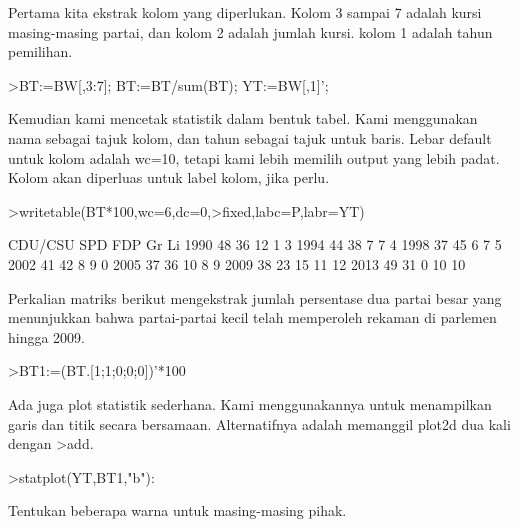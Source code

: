 \documentclass{article}
\begin{document}
\begin{eulernotebook}
\begin{eulercomment}
\begin{eulercomment}
\begin{eulercomment}
Pertama kita ekstrak kolom yang diperlukan. Kolom 3 sampai 7 adalah
kursi masing-masing partai, dan kolom 2 adalah jumlah kursi. kolom 1
adalah tahun pemilihan.
\end{eulercomment}
\begin{eulerprompt}
>BT:=BW[,3:7]; BT:=BT/sum(BT); YT:=BW[,1]';
\end{eulerprompt}
\begin{eulercomment}
Kemudian kami mencetak statistik dalam bentuk tabel. Kami menggunakan
nama sebagai tajuk kolom, dan tahun sebagai tajuk untuk baris. Lebar
default untuk kolom adalah wc=10, tetapi kami lebih memilih output
yang lebih padat. Kolom akan diperluas untuk label kolom, jika perlu.
\end{eulercomment}
\begin{eulerprompt}
>writetable(BT*100,wc=6,dc=0,>fixed,labc=P,labr=YT)
\end{eulerprompt}
\begin{euleroutput}
         CDU/CSU   SPD   FDP    Gr    Li
    1990      48    36    12     1     3
    1994      44    38     7     7     4
    1998      37    45     6     7     5
    2002      41    42     8     9     0
    2005      37    36    10     8     9
    2009      38    23    15    11    12
    2013      49    31     0    10    10
\end{euleroutput}
\begin{eulercomment}
Perkalian matriks berikut mengekstrak jumlah persentase dua partai
besar yang menunjukkan bahwa partai-partai kecil telah memperoleh
rekaman di parlemen hingga 2009.
\end{eulercomment}
\begin{eulerprompt}
>BT1:=(BT.[1;1;0;0;0])'*100
\end{eulerprompt}
\begin{euleroutput}
  [84.29,  81.25,  81.1659,  82.7529,  72.9642,  61.8971,  79.8732]
\end{euleroutput}
\begin{eulercomment}
Ada juga plot statistik sederhana. Kami menggunakannya untuk
menampilkan garis dan titik secara bersamaan. Alternatifnya adalah
memanggil plot2d dua kali dengan \textgreater{}add.
\end{eulercomment}
\begin{eulerprompt}
>statplot(YT,BT1,"b"):
\end{eulerprompt}
\begin{eulercomment}
Tentukan beberapa warna untuk masing-masing pihak.

\end{eulercomment}
\end{eulercomment}
\end{eulercomment}
\end{eulernotebook}
\end{document}
